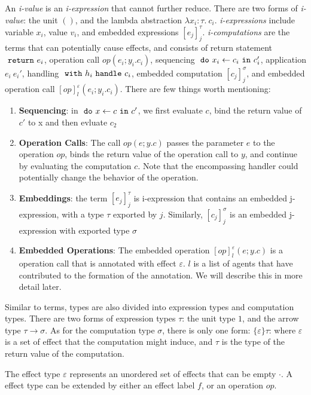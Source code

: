 An \emph{i-value} is an \emph{i-expression} that cannot further reduce. There are two forms of \emph{i-value}: the unit $()$, and the lambda abstraction $\lambda x_i: \tau.\ c_i$. \emph{i-expressions} include variable $x_i$, value $v_i$, and embedded expressions $[e_j]^\tau_j$. \emph{i-computations} are the terms that can potentially cause effects, and consists of return statement $\ \texttt{return}\  e_i$, operation call $op(e_i; y_i.c_i)$, sequencing $\ \texttt{do}\  x_i \leftarrow c_i \ \texttt{in}\  c_i'$, application $e_i\ e_i'$, handling $\ \texttt{with}\  h_i \ \texttt{handle}\  c_i$, embedded computation $[c_j]^\sigma_j$, and embedded operation call $[op]^\varepsilon_l(e_i; y_i.c_i)$. There are few things worth mentioning: 
\begin{enumerate}
\item[] \textbf{Sequencing}: in $\ \texttt{do}\  x \leftarrow c \ \texttt{in}\  c'$, we first evaluate $c$,  bind the return value of $c'$ to x and then evluate $c_2$
\item[] \textbf{Operation Calls}: The call $op(e; y.c)$ passes the parameter $e$ to the operation $op$,  binds the return value of the operation call to $y$, and continue by evaluating the computation $c$. Note that the encompassing handler could potentially change the behavior of the operation.
\item[] \textbf{Embeddings}: the term $[e_j]^\tau_j$ is i-expression that contains an embedded j-expression, with a type $\tau$ exported by $j$. Similarly, $[c_j]^\sigma_j$ is an embedded j-expression with exported type $\sigma$ 
\item[] \textbf{Embedded Operations}: The embedded operation $[op]^\varepsilon_l(e; y.c)$ is a operation call that is annotated with effect $\varepsilon$. $l$ is a list of agents that have contributed to the formation of the annotation. We will describe this in more detail later.
\end{enumerate}

Similar to terms, types are also divided into expression types and computation types. There are two forms of expression types $\tau$: the unit type $1$, and the arrow type $\tau \rightarrow \sigma$. As for the computation type $\sigma$, there is only one form: $\{\varepsilon\}\tau$: where $\varepsilon$ is a set of effect that the computation might induce, and $\tau$ is the type of the return value of the computation. 

The effect type $\varepsilon$ represents an unordered set of effects that can be empty $\cdot$. A effect type can be extended by either an effect label $f$, or an operation $op$.

